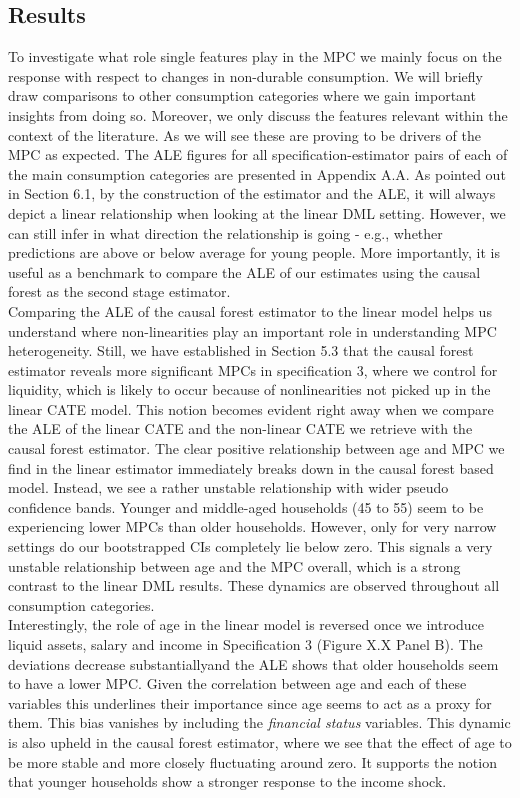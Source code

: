 \subsection{Results} 
To investigate what role single features play in the MPC we mainly focus on the response with respect to changes in non-durable consumption. We will briefly draw comparisons to other consumption categories where we gain important insights from doing so. Moreover, we only discuss the features relevant within the context of the literature. As we will see these are proving to be drivers of the MPC as expected. The ALE figures for all specification-estimator pairs of each of the main consumption categories are presented in Appendix A.A. As pointed out in Section 6.1, by the construction of the estimator and the ALE, it will always depict a linear relationship when looking at the linear DML setting. However, we can still infer in what direction the relationship is going - e.g., whether predictions are above or below average for young people. More importantly, it is useful as a benchmark to compare the ALE of our estimates using the causal forest as the second stage estimator. \\
Comparing the ALE of the causal forest estimator to the linear model helps us understand where non-linearities play an important role in understanding MPC heterogeneity. Still, we have established in Section 5.3 that the causal forest estimator reveals more significant MPCs in specification 3, where we control for liquidity, which is likely to occur because of nonlinearities not picked up in the linear CATE model. This notion becomes evident right away when we compare the ALE of the linear CATE and the non-linear CATE we retrieve with the causal forest estimator. The clear positive relationship between age and MPC we find in the linear estimator immediately breaks down in the causal forest based model. Instead, we see a rather unstable relationship with wider pseudo confidence bands. Younger and middle-aged households (45 to 55) seem to be experiencing lower MPCs than older households. However, only for very narrow settings do our bootstrapped CIs completely lie below zero. This signals a very unstable relationship between age and the MPC overall, which is a strong contrast to the linear DML results. These dynamics are observed throughout all consumption categories. \\
Interestingly, the role of age in the linear model is reversed once we introduce liquid assets, salary and income in Specification 3 (Figure X.X Panel B). The deviations decrease substantiallyand the ALE shows that older households seem to have a lower MPC. Given the correlation between age and each of these variables this underlines their importance since age seems to act as a proxy for them. This bias vanishes by including the \textit{financial status} variables. This dynamic is also upheld in the causal forest estimator, where we see that the effect of age to be more stable and more closely fluctuating around zero. It supports the notion that younger households show a stronger response to the income shock. \\
